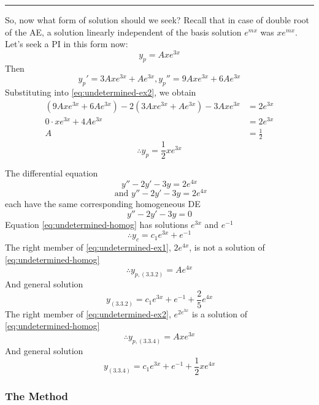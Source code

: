 {\rule{4in}{0.25pt}

So, now what form of solution should we seek? Recall that in case of double root of the AE, a solution linearly independent of the basis solution $e^{mx}$ was $xe^{mx}$. Let's seek a PI in this form now:
\begin{equation}
    y_p = Axe^{3x}
\end{equation}
Then \[
    y_p' = 3Axe^{3x} + Ae^{3x}, y_p'' = 9Axe^{3x} + 6Ae^{3x}
\]
Substituting into \eqref{eq:undetermined-ex2}, we obtain
\begin{align*}
    (9Axe^{3x} + 6Ae^{3x}) - 2(3Axe^{3x} + Ae^{3x}) - 3Axe^{3x} &= 2e^{3x} \\
    0 \cdot xe^{3x} + 4Ae^{3x} &= 2e^{3x} \\
    A &= \frac{1}{2}
\end{align*}
\[ \therefore y_p = \frac{1}{2}xe^{3x} \]
}

The differential equation
\begin{equation}\tag{3.3.2}
    y'' - 2y' - 3y = 2e^{4x}
\end{equation}
\begin{equation}\tag{3.3.4}
    \text{ and } y'' - 2y' - 3y = 2e^{4x}
\end{equation}
each have the same corresponding homogeneous DE
\begin{equation}\tag{3.3.6}
    y'' - 2y' - 3y = 0
\end{equation}
Equation \eqref{eq:undetermined-homog} has solutions $e^{3x}$ and $e^{-1}$ \[
    \therefore y_c = c_1e^{3x} + e^{-1}
\]
The right member of \eqref{eq:undetermined-ex1}, $2e^{4x}$, is not a solution of \eqref{eq:undetermined-homog}
\begin{equation}
    \therefore y_{p,(3.3.2)} = Ae^{4x}
\end{equation}
And general solution \[
    y_{(3.3.2)} = c_1e^{3x} + e^{-1} + \frac{2}{5}e^{4x}
\]
The right member of \eqref{eq:undetermined-ex2}, $e^{2e^{3x}}$ is a solution of \eqref{eq:undetermined-homog}
\begin{equation}
    \therefore y_{p, (3.3.4)} = Axe^{3x}
\end{equation}
And general solution \[
    y_{(3.3.4)} = c_1e^{3x} + e^{-1} + \frac{1}{2}xe^{4x}
\]

\vspace{20pt}
\subsubsection{The Method}

